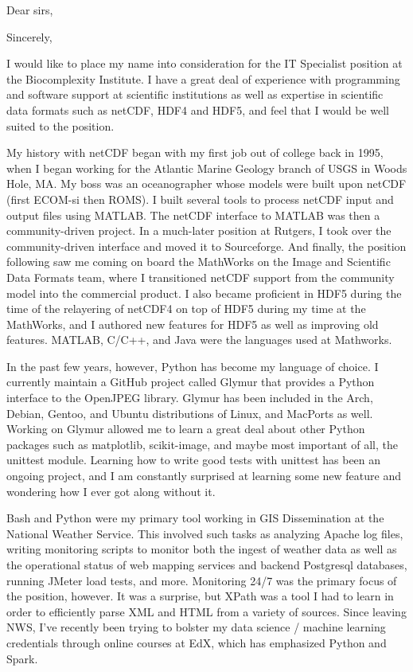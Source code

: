 \documentclass[11pt]{moderncv}  %
\begin{document}
\makecvtitle

\opening{Dear sirs,}
\closing{Sincerely,}


\makelettertitle

I would like to place my name into consideration for the IT Specialist position at the Biocomplexity Institute.   I have a great deal of experience with programming and software support at scientific institutions as well as expertise in scientific data formats such as netCDF, HDF4 and HDF5, and feel that I would be well suited to the position.

My history with netCDF began with my first job out of college back in 1995, 
when I began working for the Atlantic Marine Geology branch of USGS in Woods Hole,
MA.  My boss was an oceanographer whose models were built upon netCDF (first ECOM-si then ROMS).  I built several tools to process netCDF input and output files using
MATLAB.  The netCDF interface to MATLAB was then a community-driven project.
In a much-later position at Rutgers, I took over the community-driven interface
and moved it to Sourceforge.  And finally, the position following saw me
coming on board the MathWorks on the Image and Scientific Data Formats team, where I transitioned netCDF support from the community model into the commercial product.  I also became proficient in HDF5 during the time of the relayering of netCDF4 on top of HDF5 during my time at the MathWorks, and I authored new features for HDF5 as well as improving old features.  MATLAB, C/C++, and Java were the languages used at Mathworks.

In the past few years, however, Python has become my language of choice.  I currently
maintain a GitHub project called Glymur that provides a Python interface
to the OpenJPEG library.  Glymur has been included in the Arch, Debian,
Gentoo, and Ubuntu distributions of Linux, and MacPorts as well.
Working on Glymur allowed me to learn a great deal about other Python
packages such as matplotlib, scikit-image, and maybe most important of
all, the unittest module.  Learning how to write good tests with unittest
has been an ongoing project, and I am constantly surprised at learning
some new feature and wondering how I ever got along without it.

Bash and Python were my primary tool working in GIS Dissemination at the National
Weather Service.  This involved such tasks as analyzing Apache log
files, writing monitoring scripts to monitor both the ingest of weather data as well as the operational status of web mapping services and backend Postgresql databases, running JMeter load tests, and more.
Monitoring 24/7 was the primary focus of the position, however.  It was a surprise, but XPath was a tool I had to learn in order to efficiently parse XML and HTML from a variety of sources. Since
leaving NWS, I've recently been trying to bolster my data science /
machine learning credentials through online courses at EdX, which has
emphasized Python and Spark.
\end{document}
